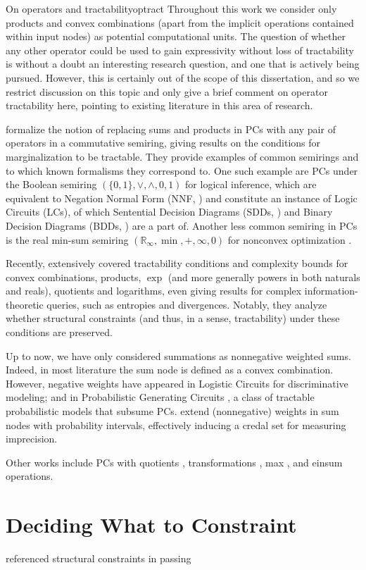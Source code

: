 \begin{remark}[breakable]{On operators and tractability}{optract}
  Throughout this work we consider only products and convex combinations (apart from the implicit
  operations contained within input nodes) as potential computational units. The question of whether
  any other operator could be used to gain expressivity without loss of tractability is without a
  doubt an interesting research question, and one that is actively being pursued. However, this is
  certainly out of the scope of this dissertation, and so we restrict discussion on this topic and
  only give a brief comment on operator tractability here, pointing to existing literature in this
  area of research.

  \citet{friesen16} formalize the notion of replacing sums and products in PCs with any pair of
  operators in a commutative semiring, giving results on the conditions for marginalization to be
  tractable. They provide examples of common semirings and to which known formalisms they
  correspond to. One such example are PCs under the Boolean semiring $(\{0,1\},\vee,\wedge,0,1)$
  for logical inference, which are equivalent to Negation Normal Form (NNF, \cite{barwise82}) and
  constitute an instance of Logic Circuits (LCs), of which Sentential Decision Diagrams (SDDs,
  \cite{darwiche11}) and Binary Decision Diagrams (BDDs, \cite{akers78}) are a part of. Another
  less common semiring in PCs is the real min-sum semiring $(\mathbb{R}_{\infty}, \min,+,\infty,0)$
  for nonconvex optimization \citep{friesen15}.

  Recently, \citet{vergari21} extensively covered tractability conditions and complexity bounds for
  convex combinations, products, $\exp$ (and more generally powers in both naturals and reals),
  quotients and logarithms, even giving results for complex information-theoretic queries, such as
  entropies and divergences. Notably, they analyze whether structural constraints (and thus, in a
  sense, tractability) under these conditions are preserved.

  Up to now, we have only considered summations as nonnegative weighted sums. Indeed, in most
  literature the sum node is defined as a convex combination. However, negative weights have
  appeared in Logistic Circuits \citep{liang19} for discriminative modeling; and in Probabilistic
  Generating Circuits \citep{zhang21}, a class of tractable probabilistic models that subsume PCs.
  \citet{maua17a} extend (nonnegative) weights in sum nodes with probability intervals, effectively
  inducing a credal set \citep{cozman00} for measuring imprecision.

  Other works include PCs with quotients \citep{sharir18a}, transformations \citep{pevny20a}, max
  \citep{melibari16}, and einsum \citep{peharz20b} operations.
\end{remark}

\section{Deciding What to Constraint}
\label{sec:const}


referenced structural constraints in passing

